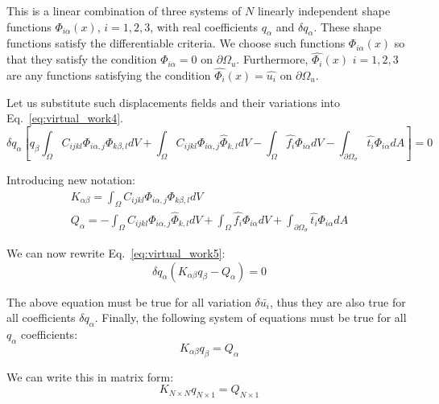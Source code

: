 \documentclass[en]{minipw} %
\begin{document}
This is a linear combination of three systems of $N$ linearly independent shape functions $\Phi_{i \alpha}(x)$, $i = 1,2,3$, with real coefficients $q_{\alpha}$ and $\delta q_{\alpha}$. These shape functions satisfy the differentiable criteria. We choose such functions $\Phi_{i \alpha}(x)$ so that they satisfy the condition $\Phi_{i \alpha} = 0$ on $\partial \Omega_{u}$. Furthermore, $\hat{\Phi_i}(x)$ $i = 1,2,3$ are any functions satisfying the condition $\hat{\Phi_{i}}(x) = \hat{u_i}$ on $\partial \Omega_{u}$.

Let us substitute such displacements fields and their variations into Eq.~\ref{eq:virtual_work4}.
\begin{equation}
\label{eq:virtual_work5}
\delta q_{\alpha}[ q_{\beta} \int_{\Omega} C_{ijkl} \Phi_{i \alpha,j} \Phi_{k \beta,l} dV + \int_{\Omega} C_{ijkl} \Phi_{i \alpha,j} \hat{\Phi}_{k,l} dV - \int_{\Omega} \hat{f_i} \Phi_{i \alpha} dV - \int_{\partial \Omega_{\sigma}} \hat{t_i}\Phi_{i \alpha} dA] = 0
\end{equation}

Introducing new notation:
\begin{equation}
\begin{aligned}
K_{\alpha \beta} = \int_{\Omega} C_{ijkl} \Phi_{i \alpha,j} \Phi_{k \beta,l} dV 
\\
Q_{\alpha} = - \int_{\Omega} C_{ijkl} \Phi_{i \alpha,j} \hat{\Phi}_{k,l} dV + \int_{\Omega} \hat{f_i} \Phi_{i \alpha} dV + \int_{\partial \Omega_{\sigma}} \hat{t_i}\Phi_{i \alpha} dA
\end{aligned}
\end{equation}

We can now rewrite Eq.~\ref{eq:virtual_work5}:
\begin{equation}
\delta q_{\alpha}(K_{\alpha \beta} q_{\beta} - Q_{\alpha}) = 0
\end{equation}

The above equation must be true for all variation $\delta \bar{u_i}$, thus they are also true for all coefficients $\delta q_{\alpha}$. Finally, the following system of equations must be true for all $q_{\alpha}$ coefficients:
\begin{equation}
K_{\alpha \beta} q_{\beta} = Q_{\alpha}
\end{equation}

We can write this in matrix form:
\begin{equation}
\label{eq:fem_system}
K_{N \times N} q_{N \times 1} = Q_{N \times 1}
\end{equation}
\end{document}
